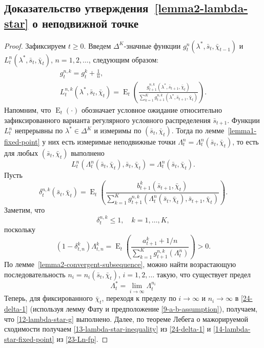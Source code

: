 \documentclass[a4paper,12pt,russian]{article} %
\theoremstyle{definition}
\DeclareMathOperator{\E}{E}
\begin{document}
\subsection{Доказательство утверждения~\ref{lemma2-lambda-star} о неподвижной точке}
\begin{proof}
Зафиксируем $t\ge 0$.
Введем $\Delta^K$-значные функции $g_{t}^n(\lambda^*, \bar s_t, \bar\chi_{t-1})$ и $L_{t}^n(\lambda^*, \bar s_t, \bar\chi_{t})$, $n=1,2,\dots$, следующим образом:
\begin{gather*}
g_{t}^{n,k} = g_{t}^k + \frac 1 n,\\
L_{t}^{n,k}(\lambda^*, \bar s_t,\bar\chi_t) = \E_t\left(
  \frac{g_{t+1}^{n,k}(\lambda^*,\bar s_{t+1}, \bar\chi_t)}
       {\sum_{k=1}^K g_{t+1}^{n,k}(\lambda^*, \bar s_{t+1}, \bar\chi_t)} 
  \right).
\end{gather*}
Напомним, что $\E_t(\cdot)$ обозначает условное ожидание относительно зафиксированного варианта регулярного условного распределения $\bar s_{t+1}$. Функции $L^n_t$ непрерывны по $\lambda^*\in \Delta^K$ и измеримы по $(\bar s_t, \bar\chi_{t})$.
Тогда по лемме~\ref{lemma1-fixed-point} у них есть измеримые неподвижные точки $\Lambda_{t}^n = \Lambda_{t}^n(\bar s_t, \bar\chi_t)$, то есть для любых $(\bar s_t,\bar \chi_t)$ выполнено
\begin{equation}
\label{23-Ln-fp}
L_t^n(\Lambda_t^n(\bar s_t, \bar\chi_t), \bar s_t, \bar \chi_t)
= \Lambda_t^n(\bar s_t, \bar\chi_t).
\end{equation}
Пусть
\[
\delta_{t}^{n,k}(\bar s_t,\bar\chi_t) 
= \E_t \left(
  \frac{b_{t+1}^k( \bar s_{t+1}, \bar\chi_t)}
       {\sum_{k=1}^K 
         g_{t+1}^{n,k}(\Lambda_{t}^n(\bar s_t, \bar\chi_t), \bar s_{t+1}, \bar\chi_t)}
  \right).
\]
Заметим, что 
\begin{equation}
\label{24-delta-1}
\delta_{t}^{n,k} \le 1, \quad k=1,\dots,K,
\end{equation}
поскольку
\[
(1-\delta_{t,n}^k)\Lambda_{t,n}^k 
= \E_t\left( 
  \frac{a_{t+1}^k + 1/n}
       {\sum_{k=1}^K g_{t+1}^{n,k}(\Lambda_{t}^n)}
  \right) > 0.
\]
По лемме~\ref{lemma2-convergent-subsequence}, можно найти возрастающую последовательность $n_i = n_i(\bar s_t, \bar\chi_t)$, $i=1,2,\dots$ такую, что существует предел
\[
\Lambda^*_{t} = \lim_{i\to\infty} \Lambda_{t}^{n_i}
\]
Теперь, для фиксированного $\bar \chi_t$, переходя к пределу по $i\to\infty$ и $n_i\to\infty$ в \eqref{24-delta-1} (используя лемму Фату и предположение \eqref{9-a-b-assumption}), получаем, что \eqref{12-lambda-star-g} выполнено.
Далее, по теореме Лебега о мажорируемой сходимости получаем \eqref{13-lambda-star-inequality} из \eqref{24-delta-1} и \eqref{14-lambda-star-fixed-point} из \eqref{23-Ln-fp}.

\end{proof}
\end{document}
